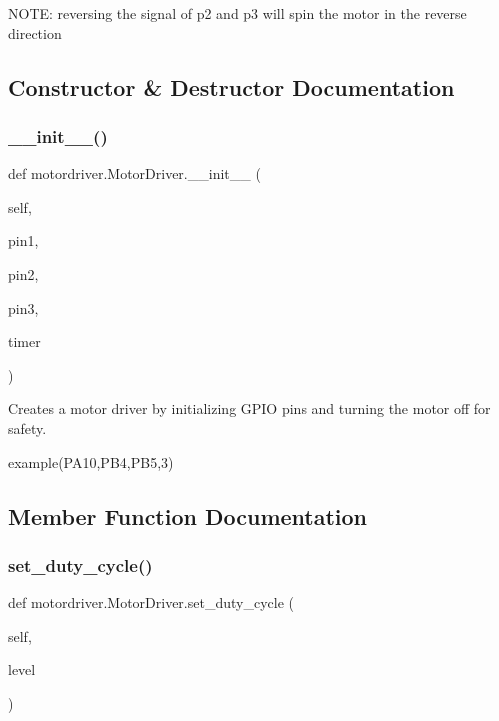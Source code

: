 N\+O\+TE\+: reversing the signal of p2 and p3 will spin the motor in the reverse direction 

\subsection{Constructor \& Destructor Documentation}
\mbox{\label{classmotordriver_1_1MotorDriver_a2b8897caed588f128042fc1521e3057c}} 
\subsubsection{\texorpdfstring{\+\_\+\+\_\+init\+\_\+\+\_\+()}{\_\_init\_\_()}}
{\footnotesize\ttfamily def motordriver.\+Motor\+Driver.\+\_\+\+\_\+init\+\_\+\+\_\+ (\begin{DoxyParamCaption}\item[{}]{self,  }\item[{}]{pin1,  }\item[{}]{pin2,  }\item[{}]{pin3,  }\item[{}]{timer }\end{DoxyParamCaption})}



Creates a motor driver by initializing G\+P\+IO pins and turning the motor off for safety. 

example(\+P\+A10,\+P\+B4,\+P\+B5,3) 

\subsection{Member Function Documentation}
\mbox{\label{classmotordriver_1_1MotorDriver_aaf4bde268698934aea24cf23343bc556}} 
\subsubsection{\texorpdfstring{set\+\_\+duty\+\_\+cycle()}{set\_duty\_cycle()}}
{\footnotesize\ttfamily def motordriver.\+Motor\+Driver.\+set\+\_\+duty\+\_\+cycle (\begin{DoxyParamCaption}\item[{}]{self,  }\item[{}]{level }\end{DoxyParamCaption})}



